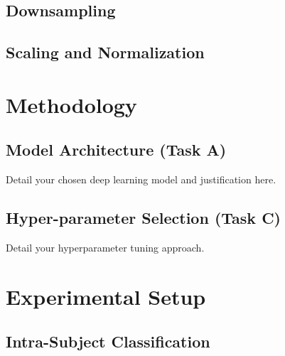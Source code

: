 \documentclass[conference]{IEEEtran}
\begin{document}
\subsection{Downsampling}

\subsection{Scaling and Normalization}

\section{Methodology}

\subsection{Model Architecture (Task A)}
Detail your chosen deep learning model and justification here.

\subsection{Hyper-parameter Selection (Task C)}
Detail your hyperparameter tuning approach.

\section{Experimental Setup}

\subsection{Intra-Subject Classification}
\end{document}
